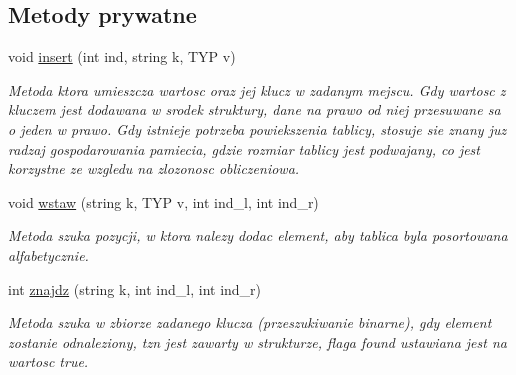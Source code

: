 \subsection*{Metody prywatne}
\begin{DoxyCompactItemize}
\item 
void \hyperlink{classtablica__asocjacyjna_a9fc42088f50eca25e7ae4ce8c84ddf4d}{insert} (int ind, string k, T\-Y\-P v)
\begin{DoxyCompactList}\small\item\em Metoda ktora umieszcza wartosc oraz jej klucz w zadanym mejscu. Gdy wartosc z kluczem jest dodawana w srodek struktury, dane na prawo od niej przesuwane sa o jeden w prawo. Gdy istnieje potrzeba powiekszenia tablicy, stosuje sie znany juz radzaj gospodarowania pamiecia, gdzie rozmiar tablicy jest podwajany, co jest korzystne ze wzgledu na zlozonosc obliczeniowa. \end{DoxyCompactList}\item 
void \hyperlink{classtablica__asocjacyjna_a5da9eecc7f4e0d7bcf31e8c5c7c49d06}{wstaw} (string k, T\-Y\-P v, int ind\-\_\-l, int ind\-\_\-r)
\begin{DoxyCompactList}\small\item\em Metoda szuka pozycji, w ktora nalezy dodac element, aby tablica byla posortowana alfabetycznie. \end{DoxyCompactList}\item 
int \hyperlink{classtablica__asocjacyjna_a70a184c5358e47655211e68925c2e12e}{znajdz} (string k, int ind\-\_\-l, int ind\-\_\-r)
\begin{DoxyCompactList}\small\item\em Metoda szuka w zbiorze zadanego klucza (przeszukiwanie binarne), gdy element zostanie odnaleziony, tzn jest zawarty w strukturze, flaga found ustawiana jest na wartosc true. \end{DoxyCompactList}\end{DoxyCompactItemize}
